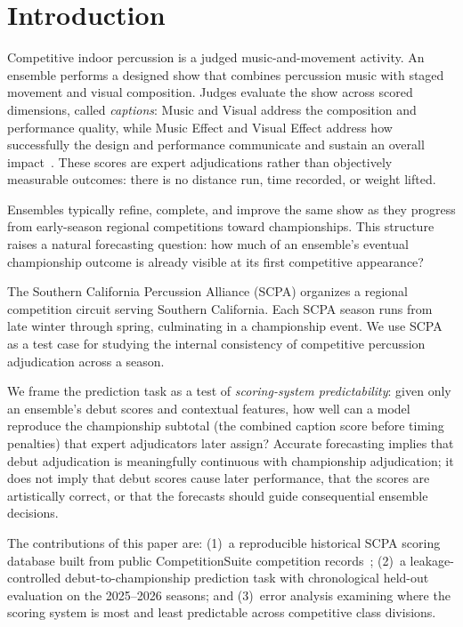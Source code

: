 \section{Introduction}
\label{sec:introduction}

Competitive indoor percussion is a judged music-and-movement activity. An
ensemble performs a designed show that combines percussion music with staged
movement and visual composition. Judges evaluate the
show across scored dimensions, called \emph{captions}: Music and Visual address
the composition and performance quality, while Music Effect and Visual Effect address
how successfully the design and performance communicate and sustain an overall
impact~\cite{wgi2026scoresheets}. These scores are expert adjudications rather
than objectively measurable outcomes: there is no distance run, time recorded,
or weight lifted.

Ensembles typically refine, complete, and improve the same show as they progress
from early-season regional competitions toward championships. This structure
raises a natural forecasting question: how much of an ensemble's eventual
championship outcome is already visible at its first competitive appearance?

The Southern California Percussion Alliance (SCPA) organizes a regional
competition circuit serving Southern California. Each SCPA season runs from
late winter through spring, culminating in a championship event. We use SCPA
as a test case for studying the internal consistency of competitive percussion
adjudication across a season.

We frame the prediction task as a test of \emph{scoring-system
predictability}: given only an ensemble's debut scores and contextual
features, how well can a model reproduce the championship subtotal (the
combined caption score before timing penalties) that expert adjudicators later
assign? Accurate forecasting implies that debut adjudication is meaningfully
continuous with championship adjudication; it
does not imply that debut scores cause later performance, that the scores are
artistically correct, or that the forecasts should guide consequential
ensemble decisions.

The contributions of this paper are: (1)~a reproducible historical SCPA
scoring database built from public CompetitionSuite competition
records~\cite{scpadb2026, csparse2026}; (2)~a leakage-controlled
debut-to-championship prediction task with chronological held-out evaluation
on the 2025--2026 seasons; and (3)~error analysis examining where the scoring
system is most and least predictable across competitive class divisions.

